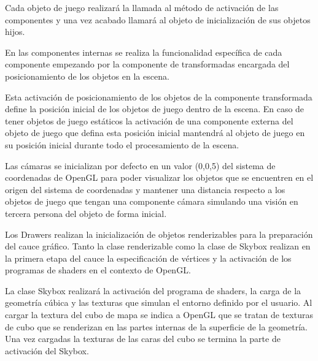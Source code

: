 \documentclass[a4paper, 17pt]{book}
\begin{document}
\vspace{1mm} %

Cada objeto de juego realizará la llamada al método de activación de las componentes y una vez acabado llamará al objeto de inicialización
de sus objetos hijos.

\vspace{1mm} %

En las componentes internas se realiza la funcionalidad específica de cada componente empezando por la componente de transformadas
encargada del posicionamiento de los objetos en la escena.

\vspace{1mm} %

Esta activación de posicionamiento de los objetos de la componente transformada define la posición inicial de los objetos de juego
dentro de la escena. En caso de tener objetos de juego estáticos la activación de una componente externa del objeto de juego que
defina esta posición inicial mantendrá al objeto de juego en su posición inicial durante todo el procesamiento de la escena.

\vspace{1mm} %

Las cámaras se inicializan por defecto en un valor (0,0,5) del sistema de coordenadas de OpenGL para poder visualizar los objetos que
se encuentren en el origen del sistema de coordenadas y mantener una distancia respecto a los objetos de juego que tengan una componente
cámara simulando una visión en tercera persona del objeto de forma inicial.

\vspace{1mm} %

Los Drawers realizan la inicialización de objetos renderizables para la preparación del cauce gráfico. Tanto la clase renderizable
como la clase de Skybox realizan en la primera etapa del cauce la especificación de vértices y la activación de los programas de
shaders en el contexto de OpenGL.

\vspace{1mm} %

La clase Skybox realizará la activación del programa de shaders, la carga de la geometría cúbica y las texturas que simulan el entorno
definido por el usuario. Al cargar la textura del cubo de mapa se indica a OpenGL que se tratan de texturas de cubo que se renderizan
en las partes internas de la superficie de la geometría. Una vez cargadas la texturas de las caras del cubo se termina la parte de
activación del Skybox.
\end{document}
